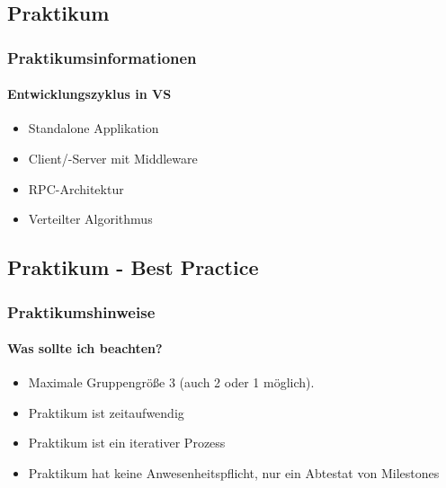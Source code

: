\subsection{Praktikum}
\begin{frame}
  \frametitle{Praktikumsinformationen}
  \framesubtitle{Entwicklungszyklus in VS}
  \begin{itemize}
    \item Standalone Applikation
    \item Client/-Server mit Middleware
    \item RPC-Architektur 
    \item Verteilter Algorithmus
  \end{itemize}
\end{frame}

\subsection{Praktikum - Best Practice}
\begin{frame}
  \frametitle{Praktikumshinweise}
  \framesubtitle{Was sollte ich beachten?}
  \begin{itemize}
    \item Maximale Gruppengröße 3 (auch 2 oder 1 möglich).
    \item Praktikum ist zeitaufwendig 
    \item Praktikum ist ein iterativer Prozess 
    \item Praktikum hat keine Anwesenheitspflicht, nur ein Abtestat von Milestones
  \end{itemize}
\end{frame}